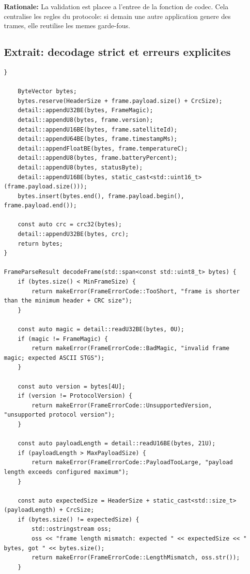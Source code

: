 \documentclass[10pt,a4paper]{article}
\newcommand{\rationale}[1]{\textbf{Rationale:} #1}
\begin{document}
\rationale{La validation est placee a l'entree de la fonction de codec. Cela centralise les regles du protocole: si demain une autre application genere des trames, elle reutilise les memes garde-fous.}

\subsection{Extrait: decodage strict et erreurs explicites}
\begin{lstlisting}[caption={Decodage strict et production d erreurs metier}]
    }

    ByteVector bytes;
    bytes.reserve(HeaderSize + frame.payload.size() + CrcSize);
    detail::appendU32BE(bytes, FrameMagic);
    detail::appendU8(bytes, frame.version);
    detail::appendU16BE(bytes, frame.satelliteId);
    detail::appendU64BE(bytes, frame.timestampMs);
    detail::appendFloatBE(bytes, frame.temperatureC);
    detail::appendU8(bytes, frame.batteryPercent);
    detail::appendU8(bytes, statusByte);
    detail::appendU16BE(bytes, static_cast<std::uint16_t>(frame.payload.size()));
    bytes.insert(bytes.end(), frame.payload.begin(), frame.payload.end());

    const auto crc = crc32(bytes);
    detail::appendU32BE(bytes, crc);
    return bytes;
}

FrameParseResult decodeFrame(std::span<const std::uint8_t> bytes) {
    if (bytes.size() < MinFrameSize) {
        return makeError(FrameErrorCode::TooShort, "frame is shorter than the minimum header + CRC size");
    }

    const auto magic = detail::readU32BE(bytes, 0U);
    if (magic != FrameMagic) {
        return makeError(FrameErrorCode::BadMagic, "invalid frame magic; expected ASCII STGS");
    }

    const auto version = bytes[4U];
    if (version != ProtocolVersion) {
        return makeError(FrameErrorCode::UnsupportedVersion, "unsupported protocol version");
    }

    const auto payloadLength = detail::readU16BE(bytes, 21U);
    if (payloadLength > MaxPayloadSize) {
        return makeError(FrameErrorCode::PayloadTooLarge, "payload length exceeds configured maximum");
    }

    const auto expectedSize = HeaderSize + static_cast<std::size_t>(payloadLength) + CrcSize;
    if (bytes.size() != expectedSize) {
        std::ostringstream oss;
        oss << "frame length mismatch: expected " << expectedSize << " bytes, got " << bytes.size();
        return makeError(FrameErrorCode::LengthMismatch, oss.str());
    }


\end{lstlisting}
\end{document}
